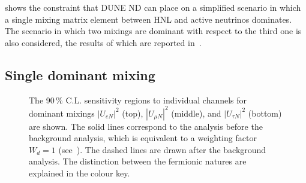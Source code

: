  shows the constraint that DUNE ND can place on a simplified scenario %
in which a single mixing matrix element between HNL and active neutrinos dominates.
The scenario in which two mixings are dominant with respect to the third one is also considered, %
the results of which are reported in~.

\subsection{Single dominant mixing}
\label{sec:dominant}

\begin{figure}
	\centering
	{\resizebox{\linewidth}{!}{}}
	\vspace{0.05em}

	{\resizebox{\linewidth}{!}{}}
	\vspace{0.05em}

	{\resizebox{\linewidth}{!}{}}

	\caption[Sensitivity regions to individual channels for dominant mixings with background analysis]%
		{The 90\,\% C.L. sensitivity regions to individual channels for dominant mixings %
		$|U_{e N}|^2$ (top), $|U_{\mu N}|^2$ (middle), and $|U_{\tau N}|^2$ (bottom) are shown.
		The solid lines correspond to the analysis before the background analysis, which is equivalent %
		to a weighting factor $W_d = 1$ (see~).
		The dashed lines are drawn after the background analysis.
		The distinction between the fermionic natures are explained in the colour key.}
	\label{fig:senseW}
\end{figure}


